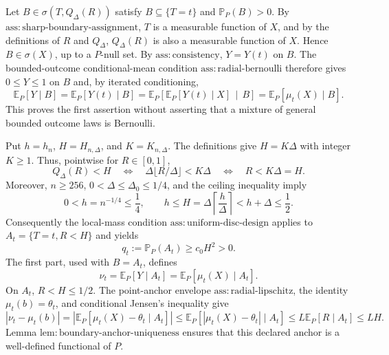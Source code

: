 Let \(B\in\sigma(T,Q_\Delta(R))\) satisfy \(B\subseteq\{T=t\}\) and \(\mathbb P_P(B)>0\).  By \(\mathrm{ass:sharp\text{-}boundary\text{-}assignment}\), \(T\) is a measurable function of \(X\), and by the definitions of \(R\) and \(Q_\Delta\), \(Q_\Delta(R)\) is also a measurable function of \(X\).  Hence \(B\in\sigma(X)\), up to a \(P\)-null set.  By \(\mathrm{ass:consistency}\), \(Y=Y(t)\) on \(B\).  The bounded-outcome conditional-mean condition \(\mathrm{ass:radial\text{-}bernoulli}\) therefore gives \(0\leq Y\leq1\) on \(B\) and, by iterated conditioning,
\[
 \mathbb E_P[Y\mid B]
 =\mathbb E_P[Y(t)\mid B]
 =\mathbb E_P\!\left[\mathbb E_P[Y(t)\mid X]\,\middle|\,B\right]
 =\mathbb E_P[\mu_t(X)\mid B].
\]
This proves the first assertion without asserting that a mixture of general bounded outcome laws is Bernoulli.

Put \(h=h_n\), \(H=H_{n,\Delta}\), and \(K=K_{n,\Delta}\).  The definitions give \(H=K\Delta\) with integer \(K\geq1\).  Thus, pointwise for \(R\in[0,1]\),
\[
 Q_\Delta(R)<H
 \quad\Longleftrightarrow\quad
 \Delta\lfloor R/\Delta\rfloor<K\Delta
 \quad\Longleftrightarrow\quad
 R<K\Delta=H.
\]
Moreover, \(n\geq256\), \(0<\Delta\leq\Delta_0\leq1/4\), and the ceiling inequality imply
\[
 0<h=n^{-1/4}\leq\frac14,
 \qquad
 h\leq H=\Delta\left\lceil\frac h\Delta\right\rceil<h+\Delta\leq\frac12.
\]
Consequently the local-mass condition \(\mathrm{ass:uniform\text{-}disc\text{-}design}\) applies to \(A_t=\{T=t,R<H\}\) and yields
\[
 q_t:=\mathbb P_P(A_t)\geq c_0H^2>0.
\]
The first part, used with \(B=A_t\), defines
\[
 \nu_t=\mathbb E_P[Y\mid A_t]
      =\mathbb E_P[\mu_t(X)\mid A_t].
\]
On \(A_t\), \(R<H\leq1/2\).  The point-anchor envelope \(\mathrm{ass:radial\text{-}lipschitz}\), the identity \(\mu_t(b)=\theta_t\), and conditional Jensen's inequality give
\[
 \left|\nu_t-\mu_t(b)\right|
 =\left|\mathbb E_P[\mu_t(X)-\theta_t\mid A_t]\right|
 \leq\mathbb E_P[|\mu_t(X)-\theta_t|\mid A_t]
 \leq L\mathbb E_P[R\mid A_t]
 \leq LH.
\]
Lemma \(\mathrm{lem:boundary\text{-}anchor\text{-}uniqueness}\) ensures that this declared anchor is a well-defined functional of \(P\).

